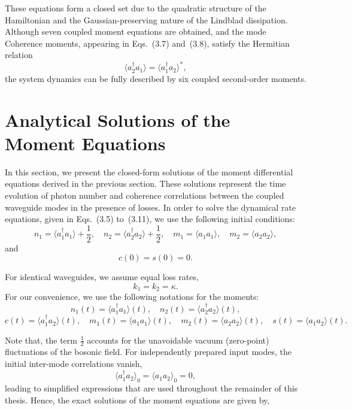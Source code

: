 These equations form a closed set due to the quadratic structure of the Hamiltonian and the
Gaussian-preserving nature of the Lindblad dissipation.
Although seven coupled moment equations are obtained, and the mode Coherence moments, appearing in Eqs.~(3.7) and~(3.8), satisfy
the Hermitian relation
\begin{equation}
	\langle a_2^\dagger a_1\rangle = \langle a_1^\dagger a_2\rangle^{*},
\end{equation}
the system dynamics can be fully described by six coupled second-order
moments.
\section{Analytical Solutions of the Moment  Equations}
In this section, we present the closed-form solutions of the moment differential equations derived in the previous section. These solutions represent the time evolution of photon number and coherence correlations between the coupled waveguide modes in the presence of losses. In order to solve the dynamical rate equations, given in Eqs.~(3.5) to~(3.11), we use the following initial conditions:
\[
n_1 = \langle a_1^\dagger a_1 \rangle + \frac{1}{2}, \quad
n_2 = \langle a_2^\dagger a_2 \rangle + \frac{1}{2}, \quad
m_1 = \langle a_1 a_1 \rangle, \quad
m_2 = \langle a_2 a_2 \rangle,
\]
and
\[
c(0) = s(0) = 0.
\]


For identical waveguides, we assume equal loss rates,
\begin{equation}
	k_1 = k_2 = \kappa .
\end{equation}
For our convenience, we use the following notations for the moments:
\[
n_{1}(t)=\langle a_{1}^{\dagger}a_{1}\rangle(t),\quad
n_{2}(t)=\langle a_{2}^{\dagger}a_{2}\rangle(t),
\]
\[
c(t)=\langle a_{1}^{\dagger}a_{2}\rangle(t),\quad
m_{1}(t)=\langle a_{1}a_{1}\rangle(t),\quad
m_{2}(t)=\langle a_{2}a_{2}\rangle(t),\quad
s(t)=\langle a_{1}a_{2}\rangle(t).
\]


Note that, the term  $\tfrac{1}{2}$  accounts for the unavoidable vacuum (zero-point) fluctuations of the bosonic field.
For independently prepared input modes, the initial inter-mode correlations vanish,
\[
\langle a_1^\dagger a_2\rangle_0=\langle a_1 a_2\rangle_0=0,
\]
leading to simplified expressions that are used throughout the remainder of this thesis.
Hence, the exact solutions of the moment equations are given by,



